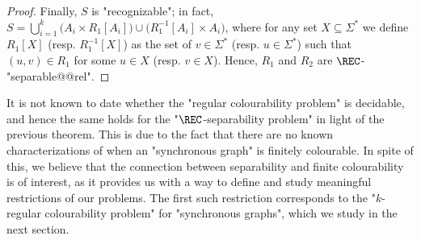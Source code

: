 \begin{proof}
    Finally, $S$ is "recognizable"; in fact, 
    $S = \bigcup_{i=1}^k \bigl( A_i \times R_1[A_i] \bigr) \cup \bigl( R_1^{-1}[A_i] \times A_i \bigr)$, 
    where for any set $X \subseteq \Sigma^*$ we define $R_1[X]$ (resp. $R_1^{-1}[X]$) as the set
    of $v\in \Sigma^*$ (resp. $u \in \Sigma^*$) such that $(u,v) \in R_1$ for some $u \in X$
    (resp. $v\in X$).
    Hence, $R_1$ and $R_2$ are $\REC$-"separable@@rel". 
\end{proof}

It is not known to date whether the "regular colourability problem" is decidable, and hence 
the same holds for the "$\REC$-separability problem"
in light of the previous theorem. This is due to the fact that there are no known characterizations of when an "synchronous graph" is finitely colourable. 
In spite of this, we believe that the connection between separability and finite colourability is of interest, as it provides us with a way to define and study meaningful 
restrictions of our problems. The first such restriction corresponds to the "$k$-regular colourability problem" for "synchronous graphs", which we study in the next section. 
